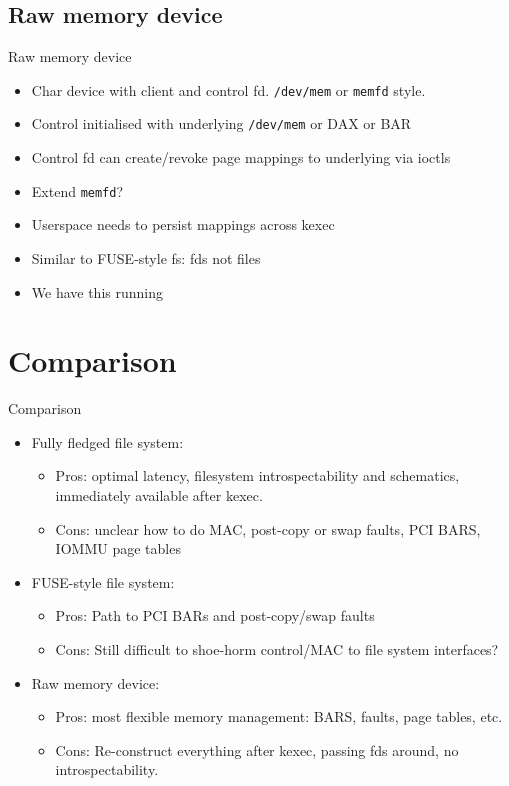 \documentclass{beamer}
\begin{document}
  \subsection{Raw memory device}
    \begin{frame}{Raw memory device}
      \begin{itemize}
        \item Char device with client and control fd. \texttt{/dev/mem} or \texttt{memfd} style.
        \item Control initialised with underlying \texttt{/dev/mem} or DAX or BAR
        \item Control fd can create/revoke page mappings to underlying via ioctls
        \item Extend \texttt{memfd}?
        \item Userspace needs to persist mappings across kexec
        \item Similar to FUSE-style fs: fds not files
        \item We have this running
      \end{itemize}
    \end{frame}

\section{Comparison}
\begin{frame}{Comparison}
  \begin{itemize}
    \item Fully fledged file system:
      \begin{itemize}
        \item Pros: optimal latency, filesystem introspectability and schematics, immediately available after kexec.
        \item Cons: unclear how to do MAC, post-copy or swap faults, PCI BARS, IOMMU page tables
      \end{itemize}
    \item FUSE-style file system:
      \begin{itemize}
        \item Pros: Path to PCI BARs and post-copy/swap faults
        \item Cons: Still difficult to shoe-horm control/MAC to file system interfaces?
      \end{itemize}
    \item Raw memory device:
      \begin{itemize}
        \item Pros: most flexible memory management: BARS, faults, page tables, etc.
        \item Cons: Re-construct everything after kexec, passing fds around, no introspectability.
      \end{itemize}
  \end{itemize}
\end{frame}
\end{document}

